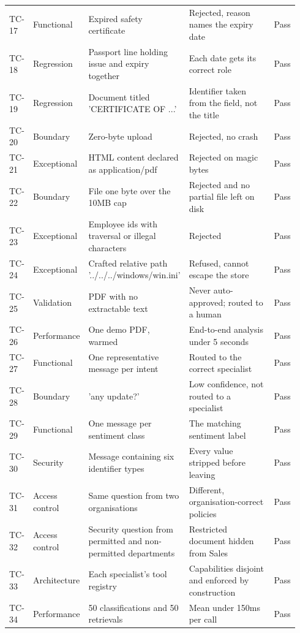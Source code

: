 \documentclass[11pt,a4paper]{article}
\begin{document}
\begin{table}[!t]
\begin{tabular}{p{0.073\linewidth}p{0.136\linewidth}p{0.313\linewidth}p{0.345\linewidth}p{0.073\linewidth}}
TC-17 & Functional & Expired safety certificate & Rejected, reason names the expiry date & Pass \\
TC-18 & Regression & Passport line holding issue and expiry together & Each date gets its correct role & Pass \\
TC-19 & Regression & Document titled 'CERTIFICATE OF ...' & Identifier taken from the field, not the title & Pass \\
TC-20 & Boundary & Zero-byte upload & Rejected, no crash & Pass \\
TC-21 & Exceptional & HTML content declared as application/pdf & Rejected on magic bytes & Pass \\
TC-22 & Boundary & File one byte over the 10MB cap & Rejected and no partial file left on disk & Pass \\
TC-23 & Exceptional & Employee ids with traversal or illegal characters & Rejected & Pass \\
TC-24 & Exceptional & Crafted relative path '../../../windows/win.ini' & Refused, cannot escape the store & Pass \\
TC-25 & Validation & PDF with no extractable text & Never auto-approved; routed to a human & Pass \\
TC-26 & Performance & One demo PDF, warmed & End-to-end analysis under 5 seconds & Pass \\
TC-27 & Functional & One representative message per intent & Routed to the correct specialist & Pass \\
TC-28 & Boundary & 'any update?' & Low confidence, not routed to a specialist & Pass \\
TC-29 & Functional & One message per sentiment class & The matching sentiment label & Pass \\
TC-30 & Security & Message containing six identifier types & Every value stripped before leaving & Pass \\
TC-31 & Access control & Same question from two organisations & Different, organisation-correct policies & Pass \\
TC-32 & Access control & Security question from permitted and non-permitted departments & Restricted document hidden from Sales & Pass \\
TC-33 & Architecture & Each specialist's tool registry & Capabilities disjoint and enforced by construction & Pass \\
TC-34 & Performance & 50 classifications and 50 retrievals & Mean under 150ms per call & Pass \\
\bottomrule
\end{tabular}
\end{table}
\end{document}
